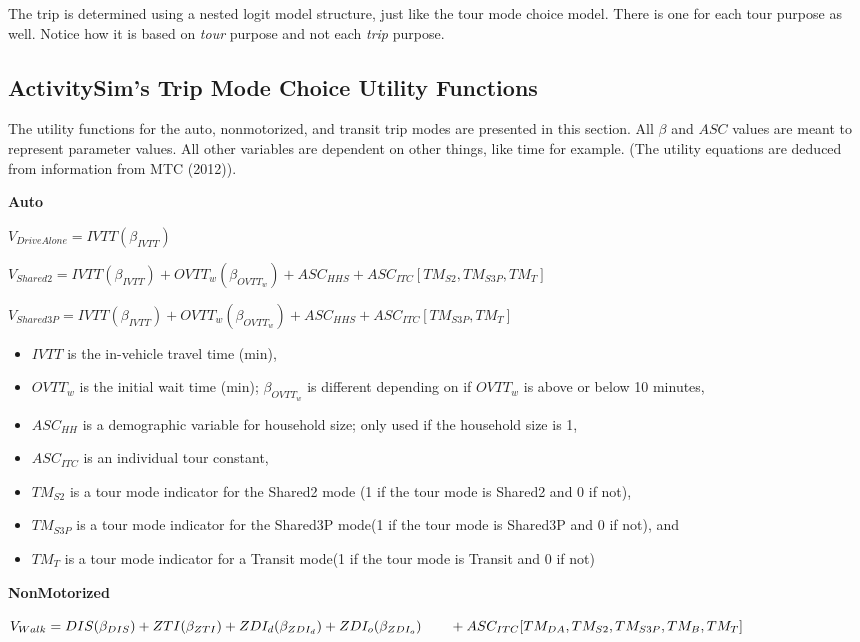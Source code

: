 \documentclass[12pt, oneside, openright]{byuthesis}
\providecommand{\tightlist}{%
  \setlength{\itemsep}{0pt}\setlength{\parskip}{0pt}}
\begin{document}
The trip is determined using a nested logit model structure, just like the tour mode choice model. There is one for each tour purpose as well. Notice how it is based on \emph{tour} purpose and not each \emph{trip} purpose.

\hypertarget{lit421}{%
\subsection{ActivitySim's Trip Mode Choice Utility Functions}\label{lit421}}

The utility functions for the auto, nonmotorized, and transit trip modes are presented in this section. All \(\beta\) and \(ASC\) values are meant to represent parameter values. All other variables are dependent on other things, like time for example. (The utility equations are deduced from information from MTC (2012)).

\textbf{Auto}

\(V_{DriveAlone} = IVTT(\beta_{IVTT})\)

\(V_{Shared2} = IVTT(\beta_{IVTT}) + OVTT_w(\beta_{OVTT_w}) + ASC_{HHS} + ASC_{ITC}[TM_{S2}, TM_{S3P}, TM_T]\)

\(V_{Shared3P} = IVTT(\beta_{IVTT}) + OVTT_w(\beta_{OVTT_w}) + ASC_{HHS} + ASC_{ITC}[TM_{S3P}, TM_T]\)

\begin{itemize}
\tightlist
\item
  \(IVTT\) is the in-vehicle travel time (min),
\item
  \(OVTT_w\) is the initial wait time (min); \(\beta_{OVTT_w}\) is different depending on if \(OVTT_w\) is above or below 10 minutes,
\item
  \(ASC_{HH}\) is a demographic variable for household size; only used if the household size is 1,
\item
  \(ASC_{ITC}\) is an individual tour constant,
\item
  \(TM_{S2}\) is a tour mode indicator for the Shared2 mode (1 if the tour mode is Shared2 and 0 if not),
\item
  \(TM_{S3P}\) is a tour mode indicator for the Shared3P mode(1 if the tour mode is Shared3P and 0 if not), and
\item
  \(TM_{T}\) is a tour mode indicator for a Transit mode(1 if the tour mode is Transit and 0 if not)
\end{itemize}

\textbf{NonMotorized}

\(V_{Walk} = DIS(\beta_{DIS}) + ZTI(\beta_{ZTI}) + ZDI_d(\beta_{ZDI_d}) + ZDI_o(\beta_{ZDI_o}) \\ \qquad+ ASC_{ITC}[TM_{DA}, TM_{S2}, TM_{S3P}, TM_{B}, TM_{T}]\)
\end{document}
